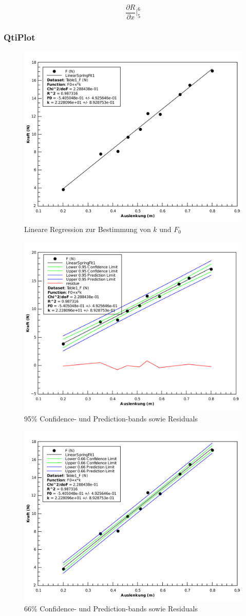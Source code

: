 \[ \frac{\partial R}{\partial x} \biggr \rvert_{5}^{6} \]


\subsubsection*{QtiPlot}

\begin{figure}[H]
    \center
    \includegraphics[width=.8\textwidth]{qtiplot/feder-linear}
    \caption{Lineare Regression zur Bestimmung von $k$ und $F_0$}
    \label{fig:feder-linear}
\end{figure}

\begin{figure}[H]
    \center
    \includegraphics[width=.8\textwidth]{qtiplot/feder-95-bands}
    \caption{95\% Confidence- und Prediction-bands sowie Residuals}
    \label{fig:feder-95-bands}
\end{figure}

\begin{figure}[H]
    \center
    \includegraphics[width=.8\textwidth]{qtiplot/feder-66-bands}
    \caption{66\% Confidence- und Prediction-bands sowie Residuals}
    \label{fig:feder-66-bands}
\end{figure}

